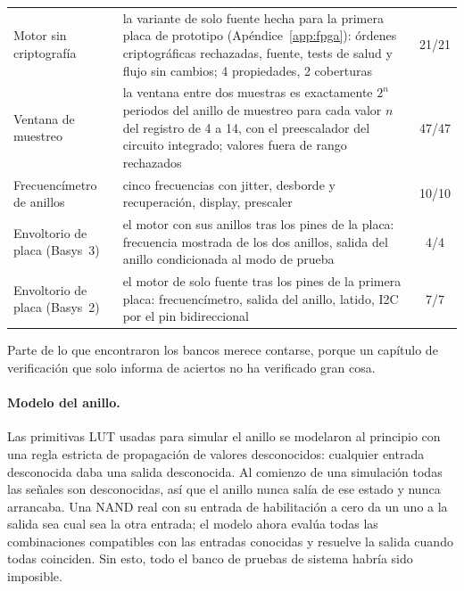 \begin{table}[htbp]
\begin{tabular}{@{}lp{8.4cm}c@{}}
Motor sin criptografía & la variante de solo fuente hecha para la primera placa de prototipo (Apéndice~\ref{app:fpga}): órdenes criptográficas rechazadas, fuente, tests de salud y flujo sin cambios; 4 propiedades, 2 coberturas & 21/21 \\
Ventana de muestreo & la ventana entre dos muestras es exactamente $2^{n}$ periodos del anillo de muestreo para cada valor $n$ del registro de 4 a 14, con el preescalador del circuito integrado; valores fuera de rango rechazados & 47/47 \\
Frecuencímetro de anillos & cinco frecuencias con jitter, desborde y recuperación, display, prescaler & 10/10 \\
Envoltorio de placa (Basys~3) & el motor con sus anillos tras los pines de la placa: frecuencia mostrada de los dos anillos, salida del anillo condicionada al modo de prueba & 4/4 \\
Envoltorio de placa (Basys~2) & el motor de solo fuente tras los pines de la primera placa: frecuencímetro, salida del anillo, latido, \ac{I2C} por el pin bidireccional & 7/7 \\
\bottomrule
\end{tabular}
\end{table}

Parte de lo que encontraron los bancos merece contarse, porque un
capítulo de verificación que solo informa de aciertos no ha verificado
gran cosa.

\paragraph{Modelo del anillo.} Las primitivas LUT usadas para simular el
anillo se modelaron al principio con una regla estricta de propagación
de valores desconocidos: cualquier entrada desconocida daba una salida
desconocida. Al comienzo de una simulación todas las señales son
desconocidas, así que el anillo nunca salía de ese estado y nunca
arrancaba. Una NAND real con su entrada de habilitación a cero da un uno
a la salida sea cual sea la otra entrada; el modelo ahora evalúa todas
las combinaciones compatibles con las entradas conocidas y resuelve la
salida cuando todas coinciden. Sin esto, todo el banco de pruebas de
sistema habría sido imposible.

